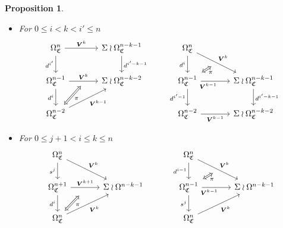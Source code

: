 \documentclass[a4paper,10pt
,draft
]{article}%
\numberwithin{equation}{section}
\numberwithin{figure}{section}
\newtheorem{proposition}[equation]{Proposition}%
\theoremstyle{definition} %
\newcommand{\1}{\ensuremath{\mathbbm 1}}%
\begin{document}
\begin{proposition}
\begin{itemize}
\begin{equation}
\begin{tikzcd}[row sep = 20pt, column sep = 35pt]
,swap,"\pi"
]
\end{tikzcd}
\end{equation}
\item[(FF2)]
For $0 \leq i < k < i' \leq n$
\begin{equation}
\begin{tikzcd}[row sep = 20pt, column sep = 35pt]
	\Omega^n_{\mathfrak{C}}
	\arrow{r}[swap,name=U]{}{\boldsymbol{V}^k} \arrow{d}[swap]{d^{i'}} &
	\Sigma \wr \Omega^{n-k-1}_{\mathfrak{C}} \ar{d}{d^{i'-k-1}}
&
	\Omega^n_{\mathfrak{C}}
	\arrow{dr}[swap,name=UUU]{}{\boldsymbol{V}^k} \arrow{d}[swap]{d^i} &
\\
	|[alias=V]|
	\Omega^{n-1}_{\mathfrak{C}} \ar{r}{\boldsymbol{V}^{k}}[swap,name=UU]{} \arrow{d}[swap]{d^i}&
	\Sigma \wr \Omega^{n-k-2}_{\mathfrak{C}}
&
	|[alias=VVV]|
	\Omega^{n-1}_{\mathfrak{C}} \ar{r}[near start, swap]{\boldsymbol{V}^{k-1}}[swap,name=UUUU]{} \ar{d}[swap]{d^{i'-1}} &
	\Sigma \wr \Omega^{n-k-1}_{\mathfrak{C}} \ar{d}{d^{i'-k-1}}
\\
	|[alias=VV]|
	\Omega^{n-2}_{\mathfrak{C}} \arrow{ur}[swap]{\boldsymbol{V}^{k-1}} &
&
	|[alias=VVVV]|
	\Omega^{n-2}_{\mathfrak{C}} \ar{r}[swap]{\boldsymbol{V}^{k-1}} &
	\Sigma \wr \Omega^{n-k-2}_{\mathfrak{C}}
\arrow[Leftrightarrow, from=VV, to=UU,shorten >=0.05cm,shorten <=0.05cm
,swap,"\pi"
]
\arrow[Leftrightarrow, from=VVV, to=UUU,shorten >=0.05cm,shorten <=0.05cm
,swap,"\pi"
]
\end{tikzcd}
\end{equation}
\item[(DF1)]
For $0 \leq j+1 < i \leq k \leq n $
\begin{equation}
\begin{tikzcd}[row sep = 20pt, column sep = 35pt]
	\Omega^{n}_{\mathfrak{C}}
	\arrow{dr}[swap,name=U]{}{\boldsymbol{V}^{k}} \arrow{d}[swap]{s^j} &
&
	\Omega^{n}_{\mathfrak{C}}
	\arrow{dr}[swap,name=UUU]{}{\boldsymbol{V}^{k}} \arrow{d}[swap]{d^{i-1}} &
\\
	|[alias=V]|
	\Omega^{n+1}_{\mathfrak{C}} \ar{r}{\boldsymbol{V}^{k+1}}[swap,name=UU]{} \arrow{d}[swap]{d^i}&
	\Sigma \wr \Omega^{n-k-1}
&
	|[alias=VVV]|
	\Omega^{n-1}_{\mathfrak{C}} \ar{r}[near start, swap]{\boldsymbol{V}^{k-1}}[swap,name=UUUU]{} \ar{d}[swap]{s^j} &
	\Sigma \wr \Omega^{n-k-1}
\\
	|[alias=VV]|
	\Omega^{n}_{\mathfrak{C}} \arrow{ur}[swap]{\boldsymbol{V}^{k}} &
&
	|[alias=VVVV]|
	\Omega^{n}_{\mathfrak{C}} \arrow{ur}[swap]{\boldsymbol{V}^{k}} &
\arrow[Leftrightarrow, from=VV, to=UU,shorten >=0.25cm,shorten <=0.05cm
,swap,"\pi"
]
\arrow[Leftrightarrow, from=VVV, to=UUU,shorten >=0.05cm,shorten <=0.05cm
,swap,"\pi"
]
\end{tikzcd}
\end{equation}


\end{itemize}
\end{proposition}
\end{document}
